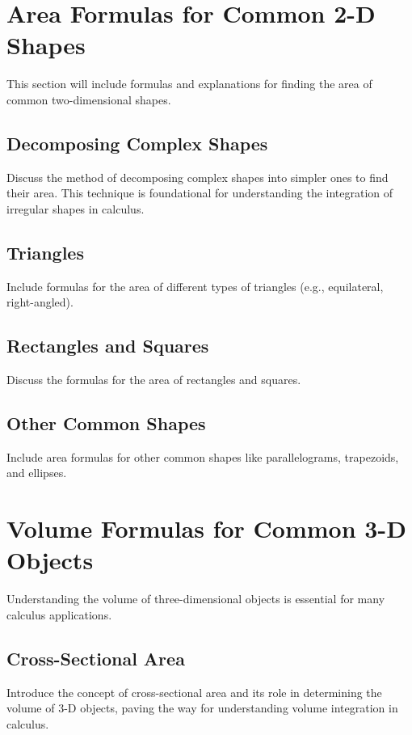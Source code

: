 \documentclass[a4paper,12pt]{book}
\begin{document}
\section{Area Formulas for Common 2-D Shapes}
\label{sec:area_formulas_2d}
This section will include formulas and explanations for finding the area of common two-dimensional shapes.


\subsection{Decomposing Complex Shapes}
\label{subsec:decomposing_complex_shapes}
Discuss the method of decomposing complex shapes into simpler ones to find their area. This technique is foundational for understanding the integration of irregular shapes in calculus.


\subsection{Triangles}
\label{subsec:area_triangles}
Include formulas for the area of different types of triangles (e.g., equilateral, right-angled).


\subsection{Rectangles and Squares}
\label{subsec:area_rectangles_squares}
Discuss the formulas for the area of rectangles and squares.


\subsection{Other Common Shapes}
\label{subsec:area_other_shapes}
Include area formulas for other common shapes like parallelograms, trapezoids, and ellipses.


\section{Volume Formulas for Common 3-D Objects}
\label{sec:volume_formulas_3d}
Understanding the volume of three-dimensional objects is essential for many calculus applications.


\subsection{Cross-Sectional Area}
\label{subsec:cross_sectional_area}
Introduce the concept of cross-sectional area and its role in determining the volume of 3-D objects, paving the way for understanding volume integration in calculus.
\end{document}
